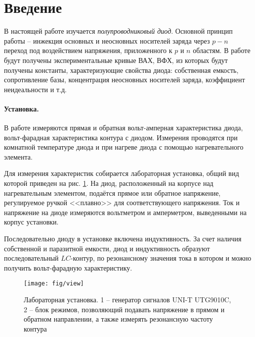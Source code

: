 \documentclass[a4paper,14pt]{extarticle}
\begin{document}


\tableofcontents
\newpage



\section*{Введение}
\vspace{-0.5em}
В настоящей работе изучается \textit{полупроводниковый диод}. Основной принцип работы -- инжекция основных и неосновных носителей заряда через $p-n$ переход под воздействием напряжения, приложенного к $p$ и $n$ областям. В работе будут получены экспериментальные кривые ВАХ, ВФХ, из которых будут получены константы, характеризующие свойства диода: собственная емкость, сопротивление базы, концентрация неосновных носителей заряда, коэффициент неидеальности и т.д.



\vspace{-0.5em}

\paragraph{Установка.} В работе измеряются прямая и обратная вольт-амперная характеристика диода, вольт-фарадная характеристика контура с диодом. Измерения проводятся при комнатной температуре диода и при нагреве диода с помощью нагревательного элемента. 

Для измерения характеристик собирается лабораторная установка, общий вид которой приведен на рис. \ref{fig:1}. На диод, расположенный на корпусе над нагревательным элементом, подаётся прямое или обратное напряжение, регулируемое ручкой <<плавно>> для соответствующего напряжения. Ток и напряжение на диоде измеряются вольтметром и амперметром, выведенными на корпус установки. 

Последовательно диоду в установке включена индуктивность. За счет наличия собственной и паразитной емкости, диод и индуктивность образуют последовательный $LC$-контур, по резонансному значения тока в котором и можно получить вольт-фарадную характеристику.

\begin{figure}[H]
	\centering
	\texttt{[image: fig/view]}
	\vspace{-1em}
	\caption{Лабораторная установка. 1 -- генератор сигналов UNI-T UTG9010C, 2 -- блок режимов, позволяющий подавать напряжение в прямом и обратном направлении, а также измерять резонансную частоту контура}
	\label{fig:1}
\end{figure}
\end{document}
